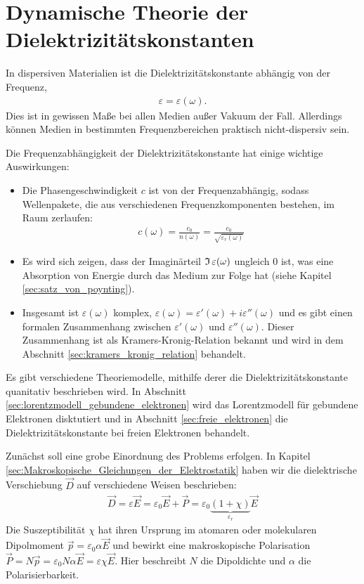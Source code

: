 \section{Dynamische Theorie der Dielektrizitätskonstanten}

In dispersiven Materialien ist die Dielektrizitätskonstante abhängig von der Frequenz,
\begin{align*}
    \varepsilon=\varepsilon(\omega).
\end{align*}
Dies ist in gewissen Maße bei allen Medien außer Vakuum der Fall. Allerdings können Medien in bestimmten Frequenzbereichen praktisch nicht-dispersiv sein.

Die Frequenzabhängigkeit der Dielektrizitätskonstante hat einige wichtige Auswirkungen:
\begin{itemize}
    \item Die Phasengeschwindigkeit $c$ ist von der Frequenzabhängig, sodass Wellenpakete, die aus verschiedenen Frequenzkomponenten bestehen, im Raum zerlaufen:
          \begin{align*}
              c(\omega) = \frac{c_0}{n(\omega)} = \frac{c_0}{\sqrt{\varepsilon_r(\omega)}}
          \end{align*}
    \item Es wird sich zeigen, dass der Imaginärteil $\operatorname{\mathfrak{I}}\varepsilon(\omega)$ ungleich 0 ist, was eine Absorption von Energie durch das Medium zur Folge hat (siehe Kapitel \ref{sec:satz_von_poynting}).
    \item Insgesamt ist $\varepsilon(\omega)$ komplex, $\varepsilon(\omega) = \varepsilon'(\omega) + i\varepsilon''(\omega)$ und es gibt einen formalen Zusammenhang zwischen $\varepsilon'(\omega)$ und $\varepsilon''(\omega)$. Dieser Zusammenhang ist als Kramers-Kronig-Relation bekannt und wird in dem Abschnitt \ref{sec:kramers_kronig_relation} behandelt.
\end{itemize}

Es gibt verschiedene Theoriemodelle, mithilfe derer die Dielektrizitätskonstante quanitativ beschrieben wird.
In Abschnitt \ref{sec:lorentzmodell_gebundene_elektronen} wird das Lorentzmodell für gebundene Elektronen disktutiert und in Abschnitt \ref{sec:freie_elektronen} die Dielektrizitätskonstante bei freien Elektronen behandelt.


Zunächst soll eine grobe Einordnung des Problems erfolgen.
In Kapitel \ref{sec:Makroskopische_Gleichungen_der_Elektrostatik} haben wir die dielektrische Verschiebung $\vec D$ auf verschiedene Weisen beschrieben:
\begin{align*}
    \vec D= \varepsilon \vec E=\varepsilon_0 \vec E+\vec P=\varepsilon_0 \underbrace{(1+\chi)}_{\varepsilon _r }\vec E
\end{align*}
Die Suszeptibilität $\chi$ hat ihren Ursprung im atomaren oder molekularen Dipolmoment $\vec p=\varepsilon_0 \alpha\vec E$ und bewirkt eine makroskopische Polarisation
$\vec P=N\vec p = \varepsilon_0 N\alpha\vec E = \varepsilon\chi\vec E$. Hier beschreibt $N$ die Dipoldichte und $\alpha$ die Polarisierbarkeit.

